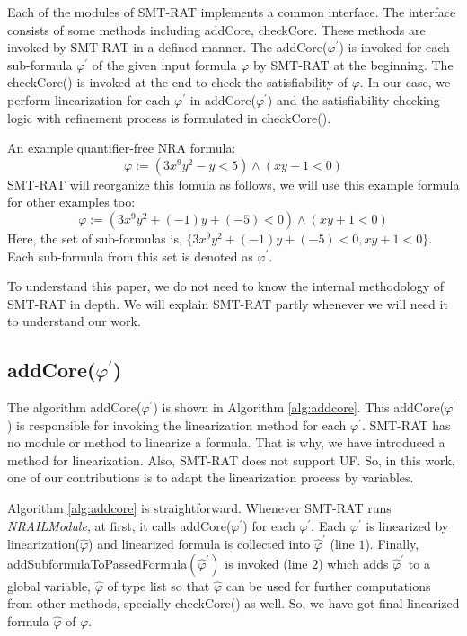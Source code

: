 \noindent Each of the modules of SMT-RAT implements a common interface.
The interface consists of some methods including addCore, checkCore. 
These methods are invoked by SMT-RAT in a defined manner.
The addCore($\varphi^\prime$) is invoked for each sub-formula $\varphi^\prime$ of the given input formula $\varphi$ by SMT-RAT at the beginning.
The checkCore() is invoked at the end to check the satisfiability of $\varphi$.
In our case, we perform linearization for each $\varphi^\prime$ in addCore($\varphi^\prime$) and the satisfiability checking logic with refinement process is formulated in checkCore().\newline

\begin{example}
\label{example:reorganization}
An example quantifier-free NRA formula:
$$\varphi := (3x^9y^2 -y < 5) \wedge (xy + 1 < 0)$$
SMT-RAT will reorganize this fomula as follows, we will use this example formula for other examples too:
$$\varphi := (3x^9y^2 + (-1)y + (-5) < 0) \wedge (xy + 1 < 0)$$
Here, the set of sub-formulas is, $\{3x^9y^2 + (-1)y + (-5) < 0, xy + 1 < 0\}$.
Each sub-formula from this set is denoted as $\varphi^\prime$.
\end{example}

\noindent To understand this paper, we do not need to know the internal methodology of SMT-RAT in depth.
We will explain SMT-RAT partly whenever we will need it to understand our work.
\subsection{addCore($\varphi^\prime$)}
\label{subsec:addCore}
The algorithm addCore($\varphi^\prime$) is shown in Algorithm \ref{alg:addcore}.
This addCore($\varphi^\prime$) is responsible for invoking the linearization method for each $\varphi^\prime$.
SMT-RAT has no module or method to linearize a formula.
That is why, we have introduced a method for linearization.
Also, SMT-RAT does not support UF.
So, in this work, one of our contributions is to adapt the linearization process by variables.\newline

\noindent Algorithm \ref{alg:addcore} is straightforward.
Whenever SMT-RAT runs \textit{NRAILModule}, at first, it calls addCore($\varphi^\prime$) for each $\varphi^\prime$.
Each $\varphi^\prime$ is linearized by linearization($\hat{\varphi}$) and linearized formula is collected into $\hat{\varphi}^\prime$ (line $1$).
Finally, addSubformulaToPassedFormula$( \hat{\varphi}^\prime )$ is invoked (line $2$) which adds $\hat{\varphi}^\prime$ to a global variable, $\hat{\varphi}$ of type list so that $\hat{\varphi}$ can be used for further computations from other methods, specially checkCore() as well.
So, we have got final linearized formula $\hat{\varphi}$ of $\varphi$.\newline

